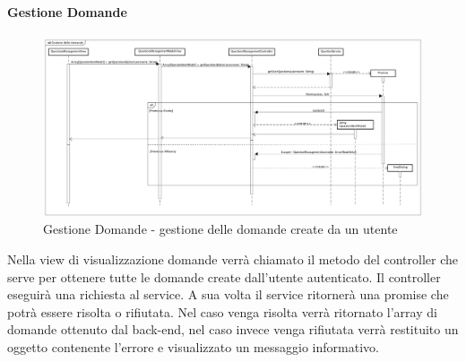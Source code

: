 \paragraph{Gestione Domande}

\label{Gestione Domande - gestione delle domande create da un utente}

\begin{figure}[ht]
	\centering
	\includegraphics[scale=0.25,keepaspectratio]{UML/DiagrammiDiSequenza/Front-End/QuestionsManagement.png}
	\caption{Gestione Domande - gestione delle domande create da un utente}
\end{figure} \FloatBarrier

Nella view di visualizzazione domande verrà chiamato il metodo del controller che serve per ottenere tutte le domande create dall'utente autenticato. Il controller eseguirà una richiesta al service. A sua volta il service ritornerà una promise che potrà essere risolta o rifiutata. Nel caso venga risolta verrà ritornato l'array di domande ottenuto dal back-end, nel caso invece venga rifiutata verrà restituito un oggetto contenente l'errore e visualizzato un messaggio informativo. 